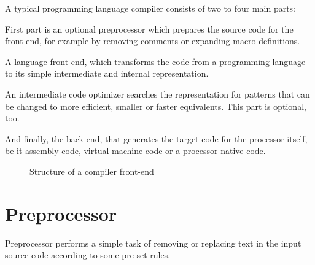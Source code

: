     A typical programming language compiler consists of two to four main parts:

    First part is an optional preprocessor which prepares the source code for the front-end, for example by removing comments or expanding macro definitions.

    A language front-end, which transforms the code from a programming language to its simple intermediate and internal representation.

    An intermediate code optimizer searches the representation for patterns that can be changed to more efficient, smaller or faster equivalents. This part is optional, too.

    And finally, the back-end, that generates the target code for the processor itself, be it assembly code, virtual machine code or a processor-native code.\cite{DragonBook}

    \begin{figure}[H]
    \centering
    \caption{Structure of a compiler front-end} \label{fig:compiler}
    \end{figure}

    \section{Preprocessor}

    Preprocessor performs a simple task of removing or replacing text in the input source code according to some pre-set rules.

